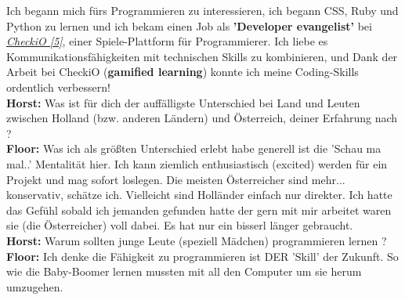 Ich begann mich fürs Programmieren zu interessieren, ich begann CSS, Ruby und Python zu lernen und ich bekam einen Job als \textbf{'Developer evangelist'} bei \href{http://www.checkio.org/}{\textit{CheckiO [5]}}, einer Spiele-Plattform für Programmierer. Ich liebe es Kommunikationsfähigkeiten mit technischen Skills zu kombinieren, und Dank der Arbeit bei CheckiO (\textbf{gamified learning}) konnte ich meine Coding-Skills ordentlich verbessern! \\
\textbf{Horst:} Was ist für dich der auffälligste Unterschied bei Land und Leuten zwischen Holland (bzw. anderen Ländern) und Österreich, deiner Erfahrung nach ? \\
\textbf{Floor:} Was ich als größten Unterschied erlebt habe generell ist die 'Schau ma mal..' Mentalität hier. Ich kann ziemlich enthusiastisch (excited) werden für ein Projekt und mag sofort loslegen. Die meisten Österreicher sind mehr... konservativ, schätze ich. Vielleicht sind Holländer einfach nur direkter. Ich hatte das Gefühl sobald ich jemanden gefunden hatte der gern mit mir arbeitet waren sie (die Österreicher) voll dabei. Es hat nur ein bisserl länger gebraucht. \\
\textbf{Horst:} Warum sollten junge Leute (speziell Mädchen) programmieren lernen ? \\
\textbf{Floor:} Ich denke die Fähigkeit zu programmieren ist DER 'Skill' der Zukunft. So wie die Baby-Boomer lernen mussten mit all den Computer um sie herum umzugehen. 

